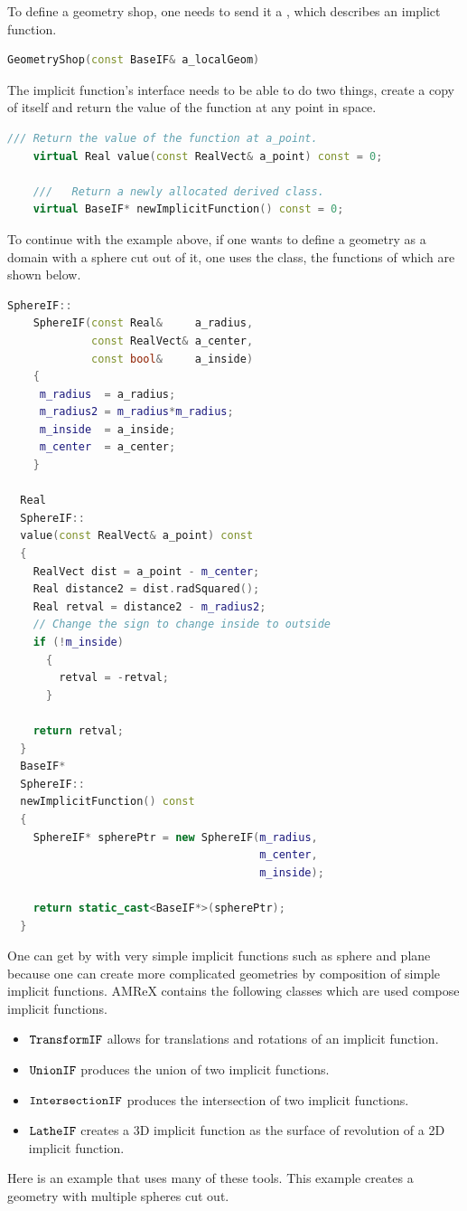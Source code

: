 To define a geometry shop, one
needs to send it a \baseif, which describes an implict function. 

\begin{lstlisting}[language=cpp]
    GeometryShop(const BaseIF& a_localGeom)
\end{lstlisting}

The implicit function's interface needs to be able to do two things,
create a copy of itself and return the value of the function at any
point in space.

\begin{lstlisting}[language=cpp]
    /// Return the value of the function at a_point.  
    virtual Real value(const RealVect& a_point) const = 0;

    ///   Return a newly allocated derived class.  
    virtual BaseIF* newImplicitFunction() const = 0;
\end{lstlisting}

To continue with the example above, if one wants to define a geometry
as a domain with  a sphere cut out of it, one uses the \sphereif
class, the functions of which are shown below.

\begin{lstlisting}[language=cpp]
    SphereIF::
    SphereIF(const Real&     a_radius,
             const RealVect& a_center,
             const bool&     a_inside)
    {
     m_radius  = a_radius;
     m_radius2 = m_radius*m_radius;
     m_inside  = a_inside;
     m_center  = a_center;
    }

  Real
  SphereIF::
  value(const RealVect& a_point) const
  {
    RealVect dist = a_point - m_center;
    Real distance2 = dist.radSquared();
    Real retval = distance2 - m_radius2;
    // Change the sign to change inside to outside
    if (!m_inside)
      {
        retval = -retval;
      }

    return retval;
  }
  BaseIF* 
  SphereIF::
  newImplicitFunction() const
  {
    SphereIF* spherePtr = new SphereIF(m_radius,
                                       m_center,
                                       m_inside);

    return static_cast<BaseIF*>(spherePtr);
  }
\end{lstlisting}

One can get by with very simple implicit functions such as sphere and
plane because one can create more complicated geometries by
composition of simple implicit functions.    AMReX contains the
following classes which are used compose implicit functions.
\begin{itemize}
\item $\tt{TransformIF}$    allows for translations and rotations of an implicit function.
\item $\tt{UnionIF}$        produces the union of two implicit functions.  
\item $\tt{IntersectionIF}$ produces the intersection of two implicit functions.
\item $\tt{LatheIF}$        creates a 3D implicit function as the surface of
  revolution of a 2D implicit function.
\end{itemize}
Here is an example that uses many of these tools.  This example
creates a geometry with multiple spheres cut out.

